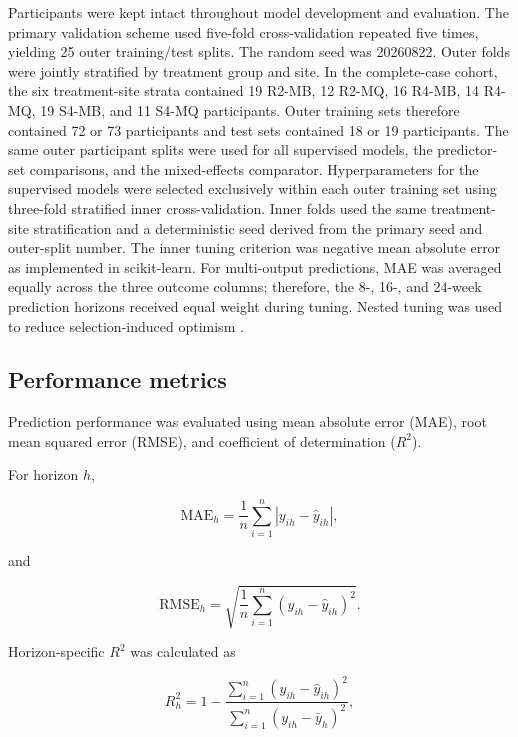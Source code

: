 \documentclass[11pt]{article}
\begin{document}
Participants were kept intact throughout model development and evaluation. The primary
validation scheme used five-fold cross-validation repeated five times, yielding 25 outer
training/test splits. The random seed was 20260822. Outer folds were jointly stratified by treatment group and site. In the complete-case cohort,
the six treatment-site strata contained 19 R2-MB, 12 R2-MQ, 16 R4-MB, 14 R4-MQ,
19 S4-MB, and 11 S4-MQ participants. Outer training sets therefore contained 72 or 73
participants and test sets contained 18 or 19 participants. The same outer participant splits were used for all supervised models, the predictor-set
comparisons, and the mixed-effects comparator. Hyperparameters for the supervised models
were selected exclusively within each outer training set using three-fold stratified inner
cross-validation. Inner folds used the same treatment-site stratification and a deterministic
seed derived from the primary seed and outer-split number. The inner tuning criterion was negative mean absolute error as implemented in
scikit-learn. For multi-output predictions, MAE was averaged equally across the three
outcome columns; therefore, the 8-, 16-, and 24-week prediction horizons received equal
weight during tuning. Nested tuning was used to reduce selection-induced optimism
\citep{cawley2010overfitting}.


\subsection{Performance metrics}

Prediction performance was evaluated using mean absolute error (MAE), root mean squared error
(RMSE), and coefficient of determination ($R^2$).

For horizon $h$,

\begin{equation}
\mathrm{MAE}_h
=
\frac{1}{n}
\sum_{i=1}^{n}
\left|
y_{ih}-\hat{y}_{ih}
\right|,
\end{equation}

and

\begin{equation}
\mathrm{RMSE}_h
=
\sqrt{
\frac{1}{n}
\sum_{i=1}^{n}
\left(
y_{ih}-\hat{y}_{ih}
\right)^2
}.
\end{equation}

Horizon-specific $R^2$ was calculated as

\begin{equation}
R_h^2
=
1-
\frac{
\sum_{i=1}^{n}
(y_{ih}-\hat{y}_{ih})^2
}{
\sum_{i=1}^{n}
(y_{ih}-\bar{y}_{h})^2
},
\end{equation}
\end{document}
